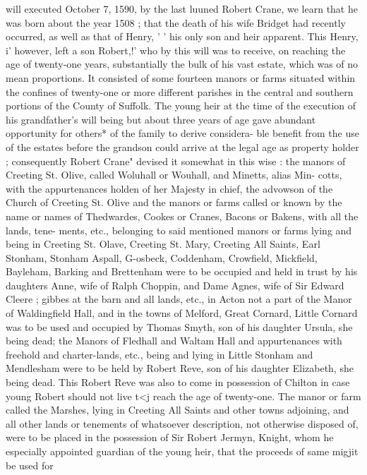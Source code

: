 \documentclass[oneside]{book}
\begin{document}
will executed October 7, 1590, by the last luuned Robert Crane, 
we learn that he was born about the year 1508 ; that the death of 
his wife Bridget had recently occurred, as well as that of Henry, ' ' 
his only son and heir apparent. This Henry, i' however, left a 
son Robert,!' who by this will was to receive, on reaching the age 
of twenty-one years, substantially the bulk of his vast estate, 
which was of no mean proportions. It consisted of some fourteen 
manors or farms situated within the confines of twenty-one or 
more different parishes in the central and southern portions of the 
County of Suffolk. The young heir at the time of the execution 
of his grandfather's will being but about three years of age gave 
abundant opportunity for others* of the family to derive considera- 
ble benefit from the use of the estates before the grandson could 
arrive at the legal age as property holder ; consequently Robert 
Crane" devised it somewhat in this wise : the manors of Creeting 
St. Olive, called Woluhall or Wouhall, and Minetts, alias Min- 
cotts, with the appurtenances holden of her Majesty in chief, the 
advowson of the Church of Creeting St. Olive and the manors or 
farms called or known by the name or names of Thedwardes, 
Cookes or Cranes, Bacons or Bakens, with all the lands, tene- 
ments, etc., belonging to said mentioned manors or farms lying 
and being in Creeting St. Olave, Creeting St. Mary, Creeting All 
Saints, Earl Stonham, Stonham Aspall, G-osbeck, Coddenham, 
Crowfield, Mickfield, Bayleham, Barking and Brettenham were to 
be occupied and held in trust by his daughters Anne, wife of 
Ralph Choppin, and Dame Agnes, wife of Sir Edward Cleere ; 
gibbes at the barn and all lands, etc., in Acton not a part of the 
Manor of Waldingfield Hall, and in the towns of Melford, Great 
Cornard, Little Cornard was to be used and occupied by Thomas 
Smyth, son of his daughter Ursula, she being dead; the Manors 
of Fledhall and Waltam Hall and appurtenances with freehold 
and charter-lands, etc., being and lying in Little Stonham and 
Mendlesham were to be held by Robert Reve, son of his daughter 
Elizabeth, she being dead. This Robert Reve was also to come 
in possession of Chilton in case young Robert should not live t<j 
reach the age of twenty-one. The manor or farm called the 
Marshes, lying in Creeting All Saints and other towns adjoining, 
and all other lands or tenements of whatsoever description, not 
otherwise disposed of, were to be placed in the possession of Sir 
Robert Jermyn, Knight, whom he especially appointed guardian 
of the young heir, that the proceeds of same migjit be used for 
\end{document}
